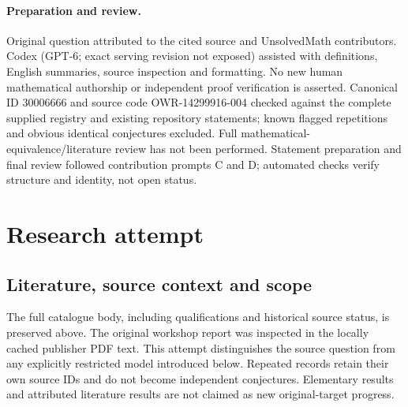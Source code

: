 \documentclass[11pt]{article}
\begin{document}
\paragraph{Preparation and review.}
Original question attributed to the cited source and UnsolvedMath contributors. Codex (GPT-6; exact serving revision not exposed) assisted with definitions, English summaries, source inspection and formatting. No new human mathematical authorship or independent proof verification is asserted. Canonical ID 30006666 and source code OWR-14299916-004 checked against the complete supplied registry and existing repository statements; known flagged repetitions and obvious identical conjectures excluded. Full mathematical-equivalence/literature review has not been performed. Statement preparation and final review followed contribution prompts C and D; automated checks verify structure and identity, not open status.
\label{end:30006666}

\section{Research attempt}
\subsection{Literature, source context and scope}
The full catalogue body, including qualifications and historical source status, is preserved above. The original workshop report was inspected in the locally cached publisher PDF text. This attempt distinguishes the source question from any explicitly restricted model introduced below. Repeated records retain their own source IDs and do not become independent conjectures. Elementary results and attributed literature results are not claimed as new original-target progress.
\end{document}

